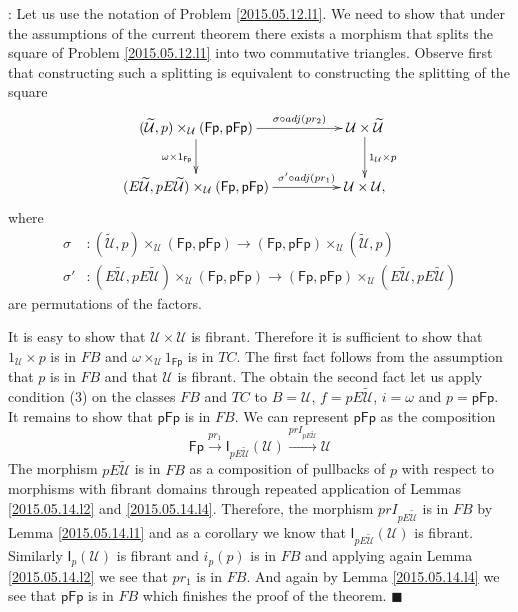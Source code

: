\documentclass[12pt]{article}
\numberwithin{equation}{section}
\newenvironment{myproof}{{\bf Proof}:}{$\blacksquare$ \vskip 5mm }
\newcommand{\sr}{\rightarrow}
\newcommand{\wt}{\widetilde}
\newcommand{\id}{1}            %
\newcommand{\U}{\mathcal{U}}
\newcommand{\I}{\mathsf{I}}
\newcommand{\Fp}{\mathsf{Fp}}
\newcommand{\pFp}{\mathsf{pFp}}
\begin{document}
\begin{myproof}
Let us use the notation of Problem \ref{2015.05.12.l1}. We need to show that
under the assumptions of the current theorem there exists a morphism that
splits the square of Problem \ref{2015.05.12.l1} into two commutative
triangles. Observe first that constructing such a splitting is equivalent to
constructing the splitting of the square
%
$$
\begin{xy}
          \xymatrix@C=4pc{ (\wt{\U},p)\times_\U (\Fp,\pFp) \ar[r]^-{\sigma\circ
              adj(pr_2)} \ar[d]_{\omega \times \id_{\Fp}} & \U\times\wt{\U}
            \ar[d]^{\id_\U\times p}\\ (E\wt{\U},pE\wt{\U})\times_\U (\Fp,\pFp)
            \ar[r]^-{\sigma'\circ adj(pr_1)} & \U\times \U, }
\end{xy}
$$
%
where
%
\begin{align*}
  \sigma & :(\wt{\U},p)\times_\U (\Fp,\pFp)\sr (\Fp,\pFp)\times_\U (\wt{\U},p) \\
  \sigma'& :(E\wt{\U},pE\wt{\U})\times_\U (\Fp,\pFp) \sr (\Fp,\pFp) \times_\U (E\wt{\U},pE\wt{\U})
\end{align*}
%
are permutations of the factors.

It is easy to show that $\U\times \U$ is fibrant. Therefore it is sufficient to
show that $\id_\U\times p$ is in $FB$ and $\omega\times_\U \id_{\Fp}$ is in
$TC$. The first fact follows from the assumption that $p$ is in $FB$ and that
$\U$ is fibrant. The obtain the second fact let us apply condition (3) on the
classes $FB$ and $TC$ to $B=\U$, $f=pE\wt{\U}$, $i=\omega$ and $p=\pFp$.  It
remains to show that $\pFp$ is in $FB$. We can represent $\pFp$ as the
composition
%
$$\Fp\stackrel{pr_1}{\sr} \I_{pE\wt{\U}}(\U) \stackrel{prI_{pE\wt{\U}}}{\sr} \U$$
%
The morphism $pE\wt{\U}$ is in $FB$ as a composition of pullbacks of $p$ with
respect to morphisms with fibrant domains through repeated application of
Lemmas \ref{2015.05.14.l2} and \ref{2015.05.14.l4}. Therefore, the morphism
$prI_{pE\wt{\U}}$ is in $FB$ by Lemma \ref{2015.05.14.l1} and as a corollary we
know that $\I_{pE\wt{\U}}(\U)$ is fibrant. Similarly $\I_p(\U)$ is fibrant and
$i_p(p)$ is in $FB$ and applying again Lemma \ref{2015.05.14.l2} we see that
$pr_1$ is in $FB$. And again by Lemma \ref{2015.05.14.l4} we see that $\pFp$ is
in $FB$ which finishes the proof of the theorem.
\end{myproof}
%
\end{document}
